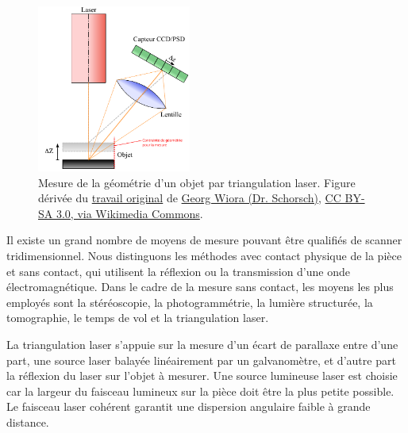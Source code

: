 \begin{figure}[htbp]
	\centering
	\includegraphics[width=0.45\textwidth]{../Chap2/Figures/Laserprofilometer_FR.pdf}
	\caption{Mesure de la géométrie d'un objet par triangulation laser. Figure dérivée du \href{https://commons.wikimedia.org/wiki/File:Laserprofilometer_EN.svg}{travail original} de \href{https://de.wikipedia.org/wiki/Benutzer:Xorx}{Georg Wiora (Dr. Schorsch)}, \href{http://creativecommons.org/licenses/by-sa/3.0/}{CC BY-SA 3.0, via Wikimedia Commons}.}
	\label{fig:laser_scanning}
\end{figure}

Il existe un grand nombre de moyens de mesure pouvant être qualifiés de scanner tridimensionnel.
Nous distinguons les méthodes avec contact physique de la pièce et sans contact, qui utilisent la réflexion ou la transmission d'une onde électromagnétique.  %
Dans le cadre de la mesure sans contact, les moyens les plus employés sont la stéréoscopie, la photogrammétrie, la lumière structurée, la tomographie, le temps de vol et la triangulation laser.

La triangulation laser s'appuie sur la mesure d'un écart de parallaxe entre d'une part, une source laser balayée linéairement par un galvanomètre, et d'autre part la réflexion du laser sur l'objet à mesurer.  %
Une source lumineuse laser est choisie car la largeur du faisceau lumineux sur la pièce doit être la plus petite possible.
Le faisceau laser cohérent garantit une dispersion angulaire faible à grande distance.

